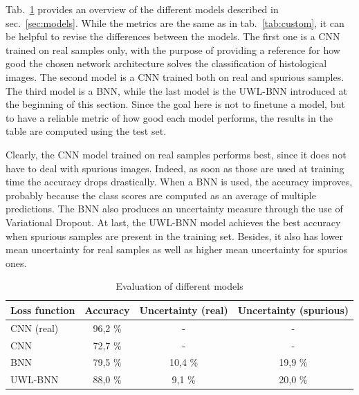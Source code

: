 \documentclass[11pt,twoside,a4paper]{article}
\begin{document}
Tab.~\ref{tab:colab} provides an overview of the different models described in sec.~\ref{sec:models}. While the metrics are the same as in tab.~\ref{tab:custom}, it can be helpful to revise the differences between the models. The first one is a CNN trained on real samples only, with the purpose of providing a reference for how good the chosen network architecture solves the classification of histological images. The second model is a CNN trained both on real and spurious samples. The third model is a BNN, while the last model is the UWL-BNN introduced at the beginning of this section. Since the goal here is not to finetune a model, but to have a reliable metric of how good each model performs, the results in the table are computed using the test set.

Clearly, the CNN model trained on real samples performs best, since it does not have to deal with spurious images. Indeed, as soon as those are used at training time the accuracy drops drastically. When a BNN is used, the accuracy improves, probably because the class scores are computed as an average of multiple predictions. The BNN also produces an uncertainty measure through the use of Variational Dropout. At last, the UWL-BNN model achieves the best accuracy when spurious samples are present in the training set. Besides, it also has lower mean uncertainty for real samples as well as higher mean uncertainty for spurios ones.

\begin{table}[!t]
  \begin{adjustwidth}{-.5in}{-.5in}
  \begin{center}
    \begin{tabular}{l | c | c | c}
      Loss function	& Accuracy	& Uncertainty (real)	& Uncertainty (spurious) \\
      \hline
      CNN (real)	& 96,2 \%		& - 				& - \\      
      CNN		& 72,7 \%		& - 				& - \\      
      BNN		& 79,5 \%		& 10,4 \% 			& 19,9 \% \\      
      UWL-BNN		& 88,0 \%		& 9,1  \% 			& 20,0 \% \\       
    \end{tabular}
    \caption{Evaluation of different models}
    \label{tab:colab}
  \end{center}
  \end{adjustwidth}
\end{table}
\end{document}
